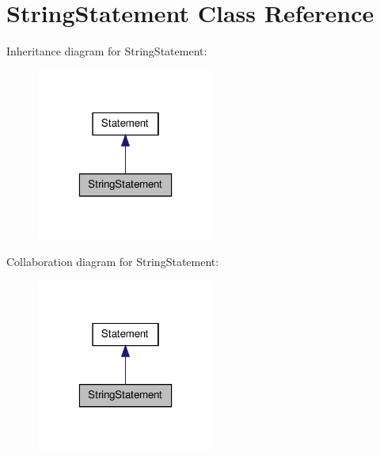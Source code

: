 \hypertarget{class_string_statement}{\section{String\-Statement Class Reference}
\label{class_string_statement}
}


Inheritance diagram for String\-Statement\-:
\nopagebreak
\begin{figure}[H]
\begin{center}
\leavevmode
\includegraphics[width=166pt]{class_string_statement__inherit__graph}
\end{center}
\end{figure}


Collaboration diagram for String\-Statement\-:
\nopagebreak
\begin{figure}[H]
\begin{center}
\leavevmode
\includegraphics[width=166pt]{class_string_statement__coll__graph}
\end{center}
\end{figure}
